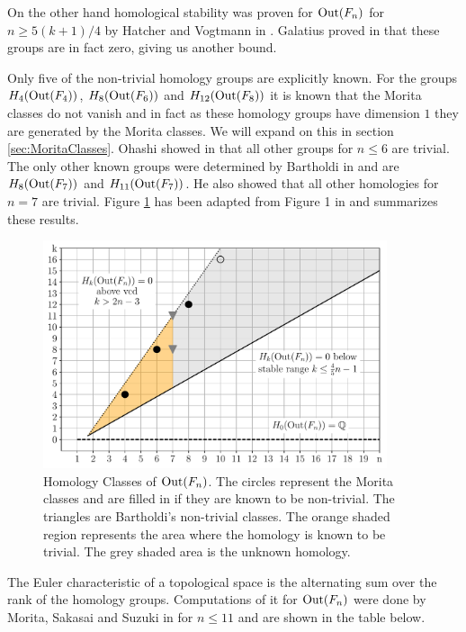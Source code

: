 On the other hand homological stability was proven for $\operatorname{Out}(F_{n})$ for $n \geq 5 (k+1) / 4$ by Hatcher and Vogtmann in \cite{hatcher04,hatcher98}.
Galatius proved in \cite{galatius11} that these groups are in fact zero, giving us another bound.

Only five of the non-trivial homology groups are explicitly known.
For the groups $H_{4}(\operatorname{Out}(F_{4}))$, $H_{8}(\operatorname{Out}(F_{6}))$ and $H_{12}(\operatorname{Out}(F_{8}))$ it is known 
that the Morita classes do not vanish and in fact as these homology groups have dimension $1$ they are generated by the Morita classes.
We will expand on this in section \ref{sec:MoritaClasses}.
Ohashi showed in \cite{ohashi08} that all other groups for $n \leq 6$ are trivial. 
The only other known groups were determined by Bartholdi in \cite{bartholdi16} and are
$H_{8}(\operatorname{Out}(F_{7}))$ and $H_{11}(\operatorname{Out}(F_{7}))$. He also showed that all other homologies for $n = 7$ are trivial.
Figure \ref{fig:homologyOfOutFn} has been adapted from Figure 1 in \cite{conant16} and summarizes these results.

\begin{figure}[htbp]
	\centering
	\captionsetup{width=0.9\textwidth}
	\includegraphics[width=0.9\textwidth]{./Images/OutFnHomology.pdf}
	\caption{Homology Classes of $\operatorname{Out}(F_{n})$. The circles represent the  Morita classes and are filled in if they are known to be non-trivial.
		The triangles are Bartholdi's non-trivial classes.
		The orange shaded region represents the area where the homology is known to be trivial.
		The grey shaded area is the unknown homology.}
	\label{fig:homologyOfOutFn}
\end{figure}

The Euler characteristic of a topological space is the alternating sum over the rank of the homology groups.
Computations of it for $\operatorname{Out}(F_{n})$ were done by Morita, Sakasai and Suzuki in \cite{morita15moduli,morita15euler} for $n \leq 11$ and are shown in the table below.

